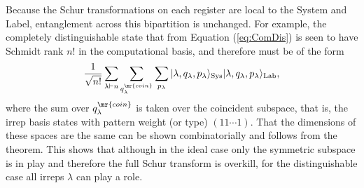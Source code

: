 Because the Schur transformations on each register are local to the System and Label, entanglement across this bipartition is unchanged.
For example, the completely distinguishable state that from Equation (\ref{eq:ComDis}) is seen to have Schmidt rank $n!$ in the computational basis, and therefore must be of the form
\begin{equation}
\frac{1}{\sqrt{n!}} \sum_{\lambda \vdash n} \sum_{q_\lambda^\mr{coin}} \sum_{p_\lambda} |\lambda,q_\lambda,p_\lambda\rangle_{\textrm{Sys}}|\lambda,q_\lambda,p_\lambda\rangle_{\textrm{Lab}},
\label{distinguishable-irreps}
\end{equation}
where the sum over $q_\lambda^\mr{coin}$ is taken over the coincident subspace, that is, the irrep basis states with pattern weight (or type) $(11\cdots 1)$.
That the dimensions of these spaces are the same can be shown combinatorially and follows from the theorem.
This shows that although in the ideal case only the symmetric subspace is in play and therefore the full Schur transform is overkill, for the distinguishable case all irreps $\lambda$ can play a role.


